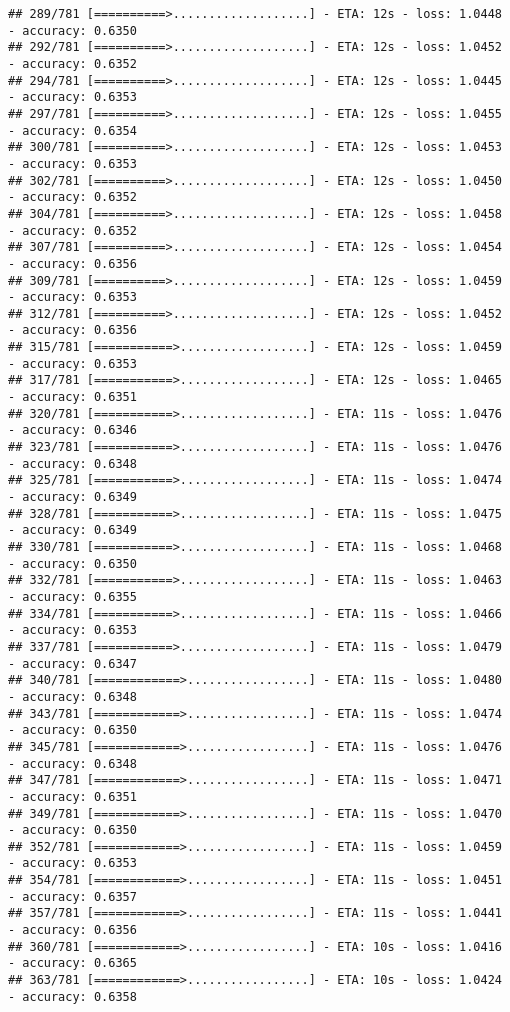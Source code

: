 \documentclass[
]{article}
\begin{document}
\begin{verbatim}
## 289/781 [==========>...................] - ETA: 12s - loss: 1.0448 - accuracy: 0.6350
## 292/781 [==========>...................] - ETA: 12s - loss: 1.0452 - accuracy: 0.6352
## 294/781 [==========>...................] - ETA: 12s - loss: 1.0445 - accuracy: 0.6353
## 297/781 [==========>...................] - ETA: 12s - loss: 1.0455 - accuracy: 0.6354
## 300/781 [==========>...................] - ETA: 12s - loss: 1.0453 - accuracy: 0.6353
## 302/781 [==========>...................] - ETA: 12s - loss: 1.0450 - accuracy: 0.6352
## 304/781 [==========>...................] - ETA: 12s - loss: 1.0458 - accuracy: 0.6352
## 307/781 [==========>...................] - ETA: 12s - loss: 1.0454 - accuracy: 0.6356
## 309/781 [==========>...................] - ETA: 12s - loss: 1.0459 - accuracy: 0.6353
## 312/781 [==========>...................] - ETA: 12s - loss: 1.0452 - accuracy: 0.6356
## 315/781 [===========>..................] - ETA: 12s - loss: 1.0459 - accuracy: 0.6353
## 317/781 [===========>..................] - ETA: 12s - loss: 1.0465 - accuracy: 0.6351
## 320/781 [===========>..................] - ETA: 11s - loss: 1.0476 - accuracy: 0.6346
## 323/781 [===========>..................] - ETA: 11s - loss: 1.0476 - accuracy: 0.6348
## 325/781 [===========>..................] - ETA: 11s - loss: 1.0474 - accuracy: 0.6349
## 328/781 [===========>..................] - ETA: 11s - loss: 1.0475 - accuracy: 0.6349
## 330/781 [===========>..................] - ETA: 11s - loss: 1.0468 - accuracy: 0.6350
## 332/781 [===========>..................] - ETA: 11s - loss: 1.0463 - accuracy: 0.6355
## 334/781 [===========>..................] - ETA: 11s - loss: 1.0466 - accuracy: 0.6353
## 337/781 [===========>..................] - ETA: 11s - loss: 1.0479 - accuracy: 0.6347
## 340/781 [============>.................] - ETA: 11s - loss: 1.0480 - accuracy: 0.6348
## 343/781 [============>.................] - ETA: 11s - loss: 1.0474 - accuracy: 0.6350
## 345/781 [============>.................] - ETA: 11s - loss: 1.0476 - accuracy: 0.6348
## 347/781 [============>.................] - ETA: 11s - loss: 1.0471 - accuracy: 0.6351
## 349/781 [============>.................] - ETA: 11s - loss: 1.0470 - accuracy: 0.6350
## 352/781 [============>.................] - ETA: 11s - loss: 1.0459 - accuracy: 0.6353
## 354/781 [============>.................] - ETA: 11s - loss: 1.0451 - accuracy: 0.6357
## 357/781 [============>.................] - ETA: 11s - loss: 1.0441 - accuracy: 0.6356
## 360/781 [============>.................] - ETA: 10s - loss: 1.0416 - accuracy: 0.6365
## 363/781 [============>.................] - ETA: 10s - loss: 1.0424 - accuracy: 0.6358

\end{verbatim}
\end{document}
